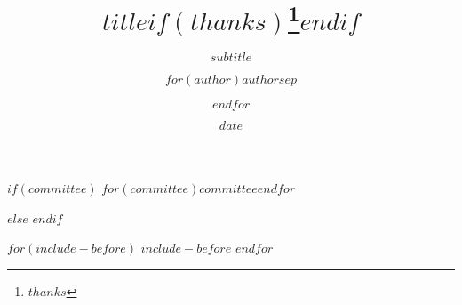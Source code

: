 \documentclass[$if(fontsize)$$fontsize$,$endif$$if(lang)$$babel-lang$,$endif$$if(papersize)$$papersize$paper,$endif$$if(beamer)$ignorenonframetext,$if(handout)$handout,$endif$$if(aspectratio)$aspectratio=$aspectratio$,$endif$$endif$$for(classoption)$$classoption$$sep$,$endfor$]{$documentclass$}
\title{$title$$if(thanks)$\thanks{$thanks$}$endif$}
\subtitle{$subtitle$}
\author{$for(author)$$author$$sep$ \and $endfor$}
\institute{$for(institute)$$institute$$sep$ \and $endfor$}
\date{$date$}
\begin{document}
\newcommand{\snukotitle}{$kotitle$}
\newcommand{\snukosubtitle}{$if(kosubtitle)$- $kosubtitle$$endif$}
\newcommand{\snuentitle}{$if(entitle)$\begin{english}$entitle$\end{english}$endif$}

\newcommand{\snukoauthor}{$koauthor$}
\newcommand{\snukoauthorrun}{$koauthorrun$}

\newcommand{\snukodegree}{$kodegree$}
\newcommand{\snukodepartment}{$kodepartment$}

\newcommand{\snukoadvisorrun}{$koadvisorrun$}


\newcommand{\snukograddate}{$graddate$}
\newcommand{\snukosubmissiondate}{$submissiondate$}
\newcommand{\snukoapprovaldate}{$approvaldate$}

\newcommand{\snucommitteememberA}{}
\newcommand{\snucommitteememberB}{}
\newcommand{\snucommitteememberC}{}
\newcommand{\snucommitteememberD}{}
\newcommand{\snucommitteememberE}{}

$if(committee)$
\newcommand{\snucommitteemembers}[5]{%
  \expandafter\renewcommand\csname snucommitteememberA\endcsname{#1}
  \expandafter\renewcommand\csname snucommitteememberB\endcsname{#2}
  \expandafter\renewcommand\csname snucommitteememberC\endcsname{#3}
  \expandafter\renewcommand\csname snucommitteememberD\endcsname{#4}
  \expandafter\renewcommand\csname snucommitteememberE\endcsname{#5}
}
\snucommitteemembers%
$for(committee)${$committee$}$endfor$

\newlength{\snuunderlinetmp}
\newlength{\snuunderlinetmpb}

\newcommand{\committeestyle}[1]{%
	\setlength{\snuunderlinetmp}{7cm}%
	\settowidth{\snuunderlinetmpb}{#1}%
	\addtolength{\snuunderlinetmp}{-\snuunderlinetmpb}%
	\divide \snuunderlinetmp by 2 %
	\underline{\hspace{\snuunderlinetmp}#1\hspace{\snuunderlinetmp} \hfill (인)}%
}

$else$
\newcommand{\committeestyle}[1]{%
	\underline{\hspace{7cm} \hfill (인)}%
}
$endif$

$for(include-before)$
$include-before$
$endfor$
\end{document}
